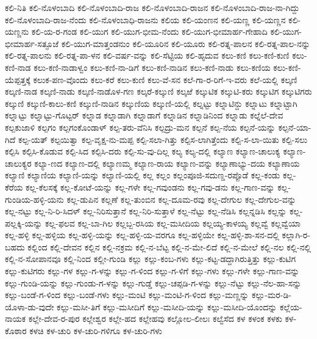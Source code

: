 ಕಲಿ-ನಿತಿ
ಕಲಿ-ನೊಳಂಬಾದಿ
ಕಲಿ-ನೊಳಂಬಾದಿ-ರಾಜ
ಕಲಿ-ನೊಳಂಬಾದಿ-ರಾಜನ
ಕಲಿ-ನೊಳಂಬಾದಿ-ರಾಜ-ನಾ-ಗಿದ್ದು
ಕಲಿ-ನೊಳಂಬಾದಿ-ರಾಜ-ನೆಂದು
ಕಲಿ-ನೊಳಂಬಾಧಿ-ರಾಜನು
ಕಲಿಯ
ಕಲಿ-ಯಂಣನ
ಕಲಿ-ಯಣ್ಣ
ಕಲಿ-ಯಣ್ಣನ
ಕಲಿ-ಯಣ್ಣನು
ಕಲಿ-ಯ-ರ-ಗಂಡ
ಕಲಿ-ಯುಗ
ಕಲಿ-ಯುಗ-ಭೀಮ-ನೆಂದು
ಕಲಿ-ಯುಗ-ಭೀಮಾರ್ಹ-ಗೇಹಾದಿ
ಕಲಿ-ಯುಗ-ಭೀಮಾರ್ಹ-ಸತ್ಫೂಜೆ
ಕಲಿ-ಯುಗ-ಮಾತ್ತಂಡನುಂ
ಕಲಿ-ಯೂರಿನ
ಕಲಿ-ಯೂರು
ಕಲಿ-ರತ್ನ-ಪಾಲನ
ಕಲಿ-ರತ್ನ-ಪಾಲ-ನನ್ನು
ಕಲಿ-ರತ್ನ-ಪಾಲನು
ಕಲಿ-ರತ್ನ-ಪಾ-ಳನ
ಕಲಿ-ವರ್ಷ-ವನ್ನು
ಕಲಿ-ಸೆಟ್ಟಿಯ
ಕಲಿ-ಹೃದುವ
ಕಲು-ಕಣಿ
ಕಲು-ಕಣಿ-ಕುಣಿ
ಕಲು-ಕಣಿ-ನಾಡ
ಕಲು-ಕಣಿ-ನಾಡಾಳ್ವಂ
ಕಲು-ಕಣಿ-ನಾ-ಡಿಗೆ
ಕಲು-ಕಣಿ-ನಾಡಿನ
ಕಲು-ಕಣಿ-ನಾಡು
ಕಲು-ಕಣಿಯ
ಕಲು-ಕಣಿ-ಯೆಪ್ಪತ್ತಕ್ಕೆ
ಕಲುಕ-ಪಣ-ವೊಂದು
ಕಲು-ಕರೆ
ಕಲು-ಕುಣಿ
ಕಲು-ವೆ-ಸನ
ಕಲೆ-ಗಾ-ರ-ರಿಗೆ-ಇ-ವರು
ಕಲೆ-ಯಲ್ಲಿ
ಕಲ್ಕಣಿ
ಕಲ್ಕಣಿ-ನಾಡ
ಕಲ್ಕಣಿ-ನಾಡು
ಕಲ್ಕಣಿ-ನಾಡೊಳ-ಗಣ
ಕಲ್ಕರೆ-ಕಲ್ಕುಣಿ
ಕಲ್ಕಱೆ
ಕಲ್ಕುಟಿಕ
ಕಲ್ಕುಟಿ-ಕರು
ಕಲ್ಕುಟಿಗ
ಕಲ್ಕುಟಿಗರು
ಕಲ್ಕುಣಿ
ಕಲ್ಕುಣಿ-ಕಾಲು-ಕಣಿ
ಕಲ್ಕುಣಿ-ನಾಡಿನ
ಕಲ್ಕುಣಿಯ
ಕಲ್ಕುಣಿ-ಯಲ್ಲಿ
ಕಲ್ನಟ್ಟು
ಕಲ್ನಾಟಿನ್ದು
ಕಲ್ನಾಟು
ಕಲ್ನಾಟ್ಟಾಗಿ
ಕಲ್ನಾಟ್ಟು
ಕಲ್ನಾಟ್ಟು-ಗೊಟ್ಟರ್
ಕಲ್ನಾಡ
ಕಲ್ನಾಡಾಗಿ
ಕಲ್ನಾಡಾಗೆ
ಕಲ್ನಾಡಿನ
ಕಲ್ನಾಡಿನಿಂದ
ಕಲ್ನಾಡು
ಕಲ್ನೆಲೆ-ದೇವ
ಕಲ್ಪಕುಜಾಳಿ
ಕಲ್ಪಗಂ
ಕಲ್ಪಗಂಕೊಂಡಾಳ್
ಕಲ್ಪ-ತರು-ವೆನಿಸಿ
ಕಲ್ಪದ್ರು-ಮನ
ಕಲ್ಪನೆ
ಕಲ್ಪ-ನೆಯ
ಕಲ್ಪನೆ-ಯನ್ನು
ಕಲ್ಪನೆ-ಯಾ-ಗಿದೆ
ಕಲ್ಪ-ಯತ್
ಕಲ್ಪಯಿತ್ವಾ
ಕಲ್ಪ-ವೃಕ್ಷ-ನು-ಮಪ್ಪ
ಕಲ್ಪಿ-ಸಲಾ-ಗಿತ್ತು
ಕಲ್ಪಿಸ-ಲಾಗಿತ್ತೆಂದು
ಕಲ್ಪಿ-ಸ-ಲಾ-ಯಿತು
ಕಲ್ಪಿ-ಸಲು
ಕಲ್ಪಿಸಿ
ಕಲ್ಪಿಸಿ-ಕೊಡುವ
ಕಲ್ಪಿ-ಸಿದ
ಕಲ್ಪಿಸಿ-ದರು
ಕಲ್ಪಿ-ಸು-ವು-ದಿಲ್ಲ
ಕಲ್ಯ
ಕಲ್ಯ-ದಲ್ಲಿ
ಕಲ್ಯಾಣ
ಕಲ್ಯಾಣ-ಚಾಲುಕ್ಯ
ಕಲ್ಯಾಣ-ಚಾಲುಕ್ಯರ
ಕಲ್ಯಾ-ಣದ
ಕಲ್ಯಾಣ-ದಲ್ಲಿ
ಕಲ್ಯಾಣಮ್ಮ
ಕಲ್ಯಾಣ-ರಾಯ
ಕಲ್ಯಾಣ-ವನ್ನು
ಕಲ್ಯಾಣಾಭ್ಯು-ದಯ
ಕಲ್ಯಾಣಾಯ
ಕಲ್ಯಾಣಿ
ಕಲ್ಯಾಣಿಯ
ಕಲ್ಯಾಣಿ-ಯನ್ನು
ಕಲ್ಯಾಣಿ-ಯಲ್ಲಿ
ಕಲ್ಲ
ಕಲ್ಲಂ
ಕಲ್ಲಂಪೂಜಿ-ಸದುಣ್ಡ-ರಪ್ಪೊಡೆ
ಕಲ್ಲ-ಕಂಡು
ಕಲ್ಲ-ಕೆರೆಯ
ಕಲ್ಲ-ಕೆಲಸಕ್ಕೆ
ಕಲ್ಲ-ಕೋಟೆ-ಯನ್ನು
ಕಲ್ಲ-ಗಳೇ
ಕಲ್ಲ-ಗವುಂಡನು
ಕಲ್ಲ-ಗವು-ಡನು
ಕಲ್ಲ-ಗಾಣ-ವನ್ನು
ಕಲ್ಲ-ಗುಂಡಿಯ-ಹಳ್ಳಿ-ಯನು
ಕಲ್ಲ-ಡುಪಿನ
ಕಲ್ಲಣೆ
ಕಲ್ಲ-ತುಂಬಿನ
ಕಲ್ಲ-ದೂಮ-ರವು
ಕಲ್ಲ-ದೇಗುಲ
ಕಲ್ಲ-ದೇಗುಲ-ವನ್ನು
ಕಲ್ಲ-ನಟ್ಟು
ಕಲ್ಲ-ನಿ-ರಿ-ಸಿದಳ್
ಕಲ್ಲ-ನಿರಿಸುತ್ತಾನೆ
ಕಲ್ಲ-ನಿರಿ-ಸುತ್ತಾಳೆ
ಕಲ್ಲ-ನೆಟ್ಟು
ಕಲ್ಲ-ನೆಡಿಸಿ
ಕಲ್ಲನ್ನಡಿಸಿ
ಕಲ್ಲನ್ನು
ಕಲ್ಲ-ಪಲ್ಲಕ್ಕಿ-ಯನ್ನು
ಕಲ್ಲ-ಫಲವ
ಕಲ್ಲ-ಬಾ-ಗಿಲ
ಕಲ್ಲಬ್ಬ-ರಸಿಯ
ಕಲ್ಲ-ಮಸೀದಿಯ
ಕಲ್ಲಯ್ಯ-ಕಾಳಯ್ಯ
ಕಲ್ಲವ್ವೆ
ಕಲ್ಲವ್ವೆಯಾ
ಕಲ್ಲ-ಹಳ್ಳಿ
ಕಲ್ಲ-ಹಳ್ಳಿಯ
ಕಲ್ಲ-ಹಳ್ಳಿ-ಯನ್ನು
ಕಲ್ಲ-ಹಳ್ಳಿ-ಯ-ವರಗೂ
ಕಲ್ಲ-ಹಳ್ಳಿಯೇ
ಕಲ್ಲ-ಹಳ್ಳಿ-ಶಾ-ಸನ-ದಲ್ಲಿ
ಕಲ್ಲಾಗಿ-ರ-ಬಹದು
ಕಲ್ಲಿಂದ
ಕಲ್ಲಿ-ದೇವನ
ಕಲ್ಲಿನ
ಕಲ್ಲಿ-ನಕ್ರಮ
ಕಲ್ಲಿ-ನ-ಬೆಟ್ಟ
ಕಲ್ಲಿ-ನ-ಮೇ-ಲಿದೆ
ಕಲ್ಲಿ-ನ-ಮೇಲೆ
ಕಲ್ಲಿ-ನಲ
ಕಲ್ಲಿ-ನಲ್ಲಿ
ಕಲ್ಲಿ-ನ-ಸೋಪಾನವೂ
ಕಲ್ಲಿ-ನಿಂದ
ಕಲ್ಲೀ-ಗುಂಡಿ
ಕಲ್ಲು
ಕಲ್ಲು-ಕಂಬ-ಗಳು
ಕಲ್ಲು-ಕಟ್ಟ-ಡದ್ದಾಗಿರುತ್ತಿತ್ತು
ಕಲ್ಲು-ಕುಟಿಗ
ಕಲ್ಲು-ಕುಟಿಗರು
ಕಲ್ಲು-ಗಳ
ಕಲ್ಲು-ಗ-ಳನ್ನು
ಕಲ್ಲು-ಗ-ಳಿಂದ
ಕಲ್ಲು-ಗ-ಳಿಗೆ
ಕಲ್ಲು-ಗಳು
ಕಲ್ಲು-ಗಳೇ
ಕಲ್ಲು-ಗಾಣ-ವನ್ನು
ಕಲ್ಲು-ಗುಂಡಿ-ಯನ್ನು
ಕಲ್ಲು-ಗುಂಡು-ಗ-ಳನ್ನು
ಕಲ್ಲು-ಗುಡ್ಡೆ
ಕಲ್ಲು-ಚಪ್ಪಡಿ-ಗ-ಳನ್ನು
ಕಲ್ಲು-ನೆಟ್ಟು
ಕಲ್ಲು-ನೆಲ-ಹಾ-ಸನ್ನು
ಕಲ್ಲು-ಬಂಡೆ-ಗ-ಳಿಂದ
ಕಲ್ಲು-ಬಂಡೆ-ಗಳು
ಕಲ್ಲು-ಮಂಟಿ
ಕಲ್ಲು-ಮಂಟಿ-ಗ-ಳಿಂದ
ಕಲ್ಲು-ಮಣ್ಣನ್ನು
ಕಲ್ಲು-ಮರ-ಡಿ-ಯೊಳಾ-ಡು-ವುದೇ
ಕಲ್ಲು-ಮಸೀ-ತಿಗೆ
ಕಲ್ಲು-ಮಸೀದಿಗೆ
ಕಲ್ಲು-ಮಸೀದಿ-ಯನ್ನು
ಕಲ್ಲು-ಮಸೀದಿ-ಯೊಂದನ್ನು
ಕಲ್ಲೆಯ-ನಾಯಕ
ಕಲ್ಲೇ-ದೇವ-ರ-ಪುರ
ಕಲ್ಲೇಶ್ವರ
ಕಲ್ಲೇ-ಹದ
ಕಲ್ಲೇಹವು
ಕಲ್ಲೋಲ-ಲೀಲಃ
ಕಲ್ವೆಸೆದ
ಕಳ
ಕಳಂಕ
ಕಳಕು
ಕಳ-ಕೊಠಾರ
ಕಳಚಿ
ಕಳ-ಚುರಿ
ಕಳ-ಚುರಿ-ಗಳಿಗೂ
ಕಳ-ಚುರಿ-ಗಳು
